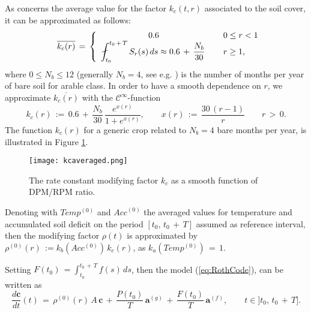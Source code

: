 \noindent  As concerns the average value for the   factor $k_c(t,r)$  associated to  the soil cover, it 
  can be approximated as follows:
  $$
    \quad \overline{ k_c(r)}\,=\, \left\{ \begin{array}{cl}
         0.6& \quad0 \leq r < 1 \\
        \displaystyle \displaystyle \fint_{t_{0}}^{t_{0}\,+\, T} S_r(s)\, ds \approx 0.6\,  +\, \displaystyle \frac{N_b}{30}\, &\quad r \geq 1,
    \end{array}
     \right.$$
where  $0\leq N_b\leq 12$ (generally $N_b=4$, see e.g. \cite{smith2005projected}) is the number of months per year of bare soil for arable class.
\noindent In order to have a smooth dependence on $r$, we approximate $\overline{k_c(r)}$ with the $\mathcal{C}^{\infty}$-function
\begin{equation}\label{eq:kc}
    k_c(r)\,:=\, 0.6\, +\, \displaystyle \frac{N_b}{30}\, \displaystyle \frac{e^{x(r)}}{1+e^{x(r)}},\qquad x(r)\,:=\, \displaystyle \frac{30\,(r-1)}{r}\qquad  r\, > \, 0.
\end{equation}
The function $k_c(r)$ for a generic crop related to $N_b=4$ bare months per year, is illustrated in Figure \ref{fig:rateconstant}. 
\begin{figure}[ht] 
\begin{center}
  \texttt{[image: kcaveraged.png]}
  \caption{The rate constant modifying factor $k_c$ as a smooth function of DPM/RPM ratio. }\label{fig:rateconstant}
\end{center} 
\end{figure}

\noindent Denoting with $Temp^{(0)}$ and  ${Acc}^{(0)}$  the averaged values  for  temperature and accumulated soil deficit  on the  period $[t_0, \, t_0\,+\,T]$ assumed as reference interval, then the modifying factor $\rho(t)$ is approximated by  $\rho^{(0)}(r)\, := k_b(Acc^{(0)})\,k_c(r)$, as  $ k_a(Temp^{(0)})\, =\, 1$.


\noindent Setting  $F(t_0)\, =\displaystyle \int_{t_0}^{t_0\,+\,T}   f(s)\,ds$, then the model (\ref{eq:RothCode}), can be written as 
\begin{equation}\label{eq:first_interval}
    \displaystyle \frac{d \mathbf{c}}{dt}(t)\, =\,
\rho^{(0)}(r)\,  A \, \mathbf{c}\,+\, \displaystyle \frac{P(t_0)}{T} \, \mathbf{a}^{(g)}\, +\, \displaystyle \frac{F(t_0)}{T}\, \mathbf{a}^{(f)}, \qquad t\in]t_0,\,t_0\,+\,T].
\end{equation}

